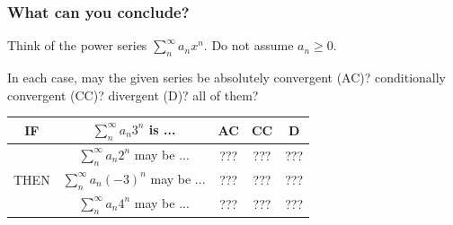 \documentclass[14pt]{beamer}
\begin{document}
\begin{frame}[t]
	\fontsize{13}{13}\selectfont
	\frametitle{What can you conclude?}

	Think of the power series $\displaystyle \sum_{n}^{\infty}a_{n}x^{n}$. Do not
	assume $a_{n}\geq0$.

	In each case, may the given series be absolutely convergent (AC)?
	conditionally convergent (CC)? divergent (D)? all of them?

	\begin{center}
		\begin{tabular}{c|c|c|c|c|}
			\hline
			IF               & $\displaystyle \sum_{n}^{\infty}a_{n}3^{n}$ is ...        & AC                                                                              & CC                                                                              & D                                                                               \\
			\hline
			\hline
			                 & $\displaystyle \sum_{n}^{\infty}a_{n}2^{n}$ may be ...    & \phantom{$\displaystyle \frac{1}{1}$} ??? \phantom{$\displaystyle \frac{1}{1}$} & \phantom{$\displaystyle \frac{1}{1}$} ??? \phantom{$\displaystyle \frac{1}{1}$} & \phantom{$\displaystyle \frac{1}{1}$} ??? \phantom{$\displaystyle \frac{1}{1}$} \\
			\cline{2-5} THEN & $\displaystyle \sum_{n}^{\infty}a_{n}(-3)^{n}$ may be ... & \phantom{$\displaystyle \frac{1}{1}$} ??? \phantom{$\displaystyle \frac{1}{1}$} & \phantom{$\displaystyle \frac{1}{1}$} ??? \phantom{$\displaystyle \frac{1}{1}$} & \phantom{$\displaystyle \frac{1}{1}$} ??? \phantom{$\displaystyle \frac{1}{1}$} \\
			\cline{2-5}      & $\displaystyle \sum_{n}^{\infty}a_{n}4^{n}$ may be ...    & \phantom{$\displaystyle \frac{1}{1}$} ??? \phantom{$\displaystyle \frac{1}{1}$} & \phantom{$\displaystyle \frac{1}{1}$} ??? \phantom{$\displaystyle \frac{1}{1}$} & \phantom{$\displaystyle \frac{1}{1}$} ??? \phantom{$\displaystyle \frac{1}{1}$} \\
			\hline
		\end{tabular}
	\end{center}
\end{frame}
\end{document}
